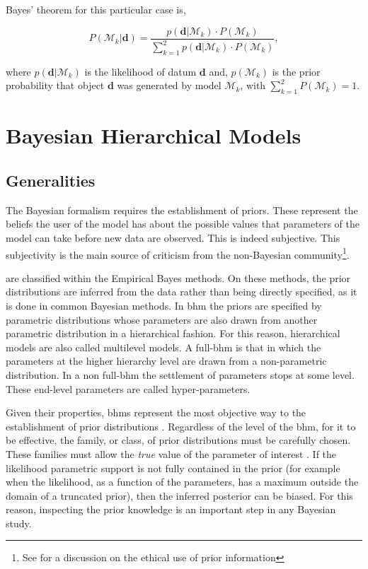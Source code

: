 Bayes' theorem for this particular case is,

\begin{equation}
\label{eq:prob}
P( \mathcal{M}_k | \mathbf{d}) =\frac{p(\mathbf{d}|\mathcal{M}_k)\cdot P(\mathcal{M}_k)}{\sum_{k=1}^2 p(\mathbf{d}|\mathcal{M}_k)\cdot P(\mathcal{M}_k)},
\end{equation}

where $p(\mathbf{d}|\mathcal{M}_k)$ is the likelihood of datum $\mathbf{d}$ and, $p(\mathcal{M}_k)$ is the prior probability that object $\mathbf{d}$ was generated by model $\mathcal{M}_k$, with $\sum_{k=1}^2P( \mathcal{M}_k) =1$.

\section{Bayesian Hierarchical Models}
\label{sect:BHM}
\subsection{Generalities}
\label{sect:generalities}
The Bayesian formalism requires the establishment of priors. These represent the beliefs the user of the model has about the possible values that parameters of the model can take {before new data are observed}. This is indeed subjective. This subjectivity is the main source of criticism from the non-Bayesian community\footnote{See \citet{Gelman2012} for a discussion on the ethical use of prior information}. 

 are classified within the Empirical Bayes methods. On these methods, the prior distributions are inferred from the data rather than being directly specified, as it is done in common Bayesian methods. In \gls{bhm} the priors are specified by parametric distributions whose parameters are also drawn from another parametric distribution in a hierarchical fashion. For this reason, hierarchical models are also called multilevel models. A full-\gls{bhm} is that in which the parameters at the higher hierarchy level are drawn from a non-parametric distribution. In a non full-\gls{bhm} the settlement of parameters stops at some level. These end-level parameters are called hyper-parameters.

Given their properties, \glspl{bhm}  represent the most objective way to the establishment of prior distributions \citep{Gelman2006}. Regardless of the level of the \gls{bhm}, for it to be effective, the family, or class, of prior distributions must be carefully chosen. These families must allow the \emph{true} value of the parameter of interest \citep{Morris1983}. If the likelihood {parametric support} is not fully contained in the prior (for example when the likelihood, as a function of the parameters, has a maximum outside the domain of a truncated prior), then the inferred posterior can be biased. For this reason, inspecting the prior knowledge is an important step in any Bayesian study.

